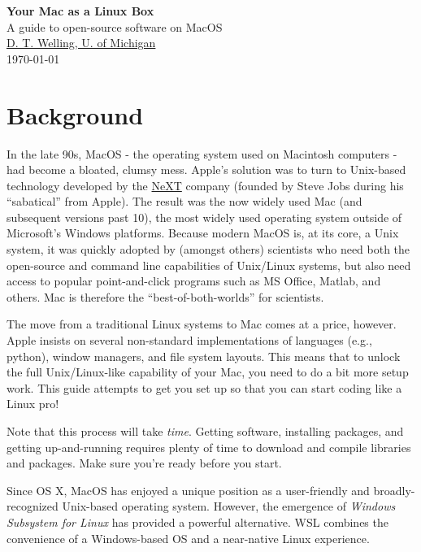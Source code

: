 \documentclass[12pt, letterpaper]{article}
\begin{document}
\begin{center}
  {\LARGE \textbf{Your Mac as a Linux Box}}\\
  {\Large A guide to open-source software on MacOS}\\
  {\large \href{mailto:dwelling@umich.edu}{D. T. Welling, U. of Michigan}}\\
  {\large \today}\\
\end{center}

\section{Background}
In the late 90s, MacOS - the operating system used on Macintosh computers - had
become a bloated, clumsy mess.  Apple's solution was to turn to Unix-based
technology developed by the \href{https://en.wikipedia.org/wiki/NeXT}{NeXT}
company (founded by Steve Jobs during his ``sabatical'' from Apple).
The result was the now widely used Mac (and subsequent versions past 10),
the most widely used operating system outside of Microsoft's Windows platforms.
Because modern MacOS is, at its core, a Unix system, it was quickly adopted by
(amongst others) scientists who need both the open-source and command line
capabilities of Unix/Linux systems, but also need access to popular
point-and-click programs such as MS Office, Matlab, and others.  Mac is
therefore the ``best-of-both-worlds'' for scientists.

The move from a traditional Linux systems to Mac comes at a price, however.
Apple insists on several non-standard implementations of languages (e.g.,
python), window managers, and file system layouts.  This means that to
unlock the full Unix/Linux-like capability of your Mac, you need to do a bit
more setup work.  This guide attempts to get you set up so that you can start
coding like a Linux pro!

Note that this process will take \emph{time}.  Getting software, installing
packages, and getting up-and-running requires plenty of time to download and
compile libraries and packages.  Make sure you're ready before you start.

\begin{tcolorbox}[title=\textbf{Growing Competition}]
  Since OS X, MacOS has enjoyed a unique position as a user-friendly and
  broadly-recognized Unix-based operating system.
  However, the emergence of \emph{Windows Subsystem for Linux} has
  provided a powerful alternative. WSL combines the convenience of a
  Windows-based OS and a near-native Linux experience.
\end{tcolorbox}
\end{document}
